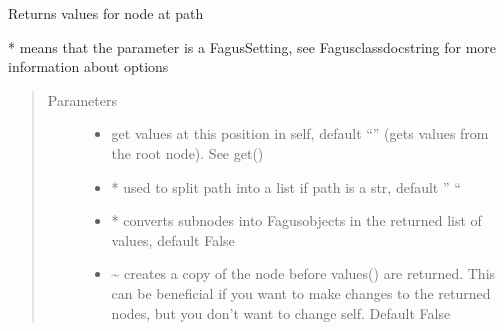 \documentclass[a4paper,10pt,english]{sphinxmanual}
\begin{document}
\begin{fulllineitems}
\begin{fulllineitems}
\begin{quote}
\begin{description}
\end{description}\end{quote}

\end{fulllineitems}


\begin{fulllineitems}
\label{\detokenize{fagus.fagus:fagus.fagus.Fagus.values}}
\pysigstartsignatures
{}
\pysigstopsignatures
\sphinxAtStartPar
Returns values for node at path

\sphinxAtStartPar
* means that the parameter is a Fagus\sphinxhyphen{}Setting, see Fagus\sphinxhyphen{}class\sphinxhyphen{}docstring for more information about options
\begin{quote}\begin{description}
\item[{Parameters}] \leavevmode\begin{itemize}
\item {}
\sphinxAtStartPar
{} \textendash{} get values at this position in self, default “” (gets values from the root node). See get()

\item {}
\sphinxAtStartPar
{} \textendash{} * used to split path into a list if path is a str, default ” “

\item {}
\sphinxAtStartPar
{} \textendash{} * converts sub\sphinxhyphen{}nodes into Fagus\sphinxhyphen{}objects in the returned list of values, default False

\item {}
\sphinxAtStartPar
{} \textendash{} \textasciitilde{} creates a copy of the node before values() are returned. This can be beneficial if you want to make
changes to the returned nodes, but you don’t want to change self. Default False


\end{itemize}
\end{description}
\end{quote}
\end{fulllineitems}
\end{fulllineitems}
\end{document}
